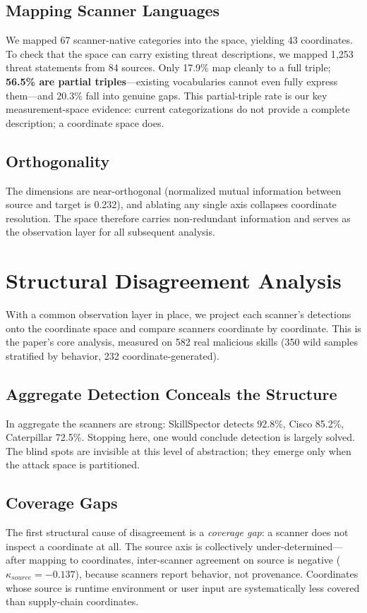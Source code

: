 \documentclass[sigconf,nonacm]{acmart}
\begin{document}
\subsection{Mapping Scanner Languages}
We mapped 67 scanner-native categories into the space, yielding 43 coordinates. To check that the space can carry existing threat descriptions, we mapped 1{,}253 threat statements from 84 sources. Only 17.9\% map cleanly to a full triple; \textbf{56.5\% are partial triples}---existing vocabularies cannot even fully express them---and 20.3\% fall into genuine gaps. This partial-triple rate is our key measurement-space evidence: current categorizations do not provide a complete description; a coordinate space does.

\subsection{Orthogonality}
The dimensions are near-orthogonal (normalized mutual information between source and target is 0.232), and ablating any single axis collapses coordinate resolution. The space therefore carries non-redundant information and serves as the observation layer for all subsequent analysis.

\section{Structural Disagreement Analysis}
\label{sec:explain}

With a common observation layer in place, we project each scanner's detections onto the coordinate space and compare scanners coordinate by coordinate. This is the paper's core analysis, measured on 582 real malicious skills (350 wild samples stratified by behavior, 232 coordinate-generated).

\subsection{Aggregate Detection Conceals the Structure}
In aggregate the scanners are strong: SkillSpector detects 92.8\%, Cisco 85.2\%, Caterpillar 72.5\%. Stopping here, one would conclude detection is largely solved. The blind spots are invisible at this level of abstraction; they emerge only when the attack space is partitioned.

\subsection{Coverage Gaps}
The first structural cause of disagreement is a \emph{coverage gap}: a scanner does not inspect a coordinate at all. The source axis is collectively under-determined---after mapping to coordinates, inter-scanner agreement on source is negative ($\kappa_{source}=-0.137$), because scanners report behavior, not provenance. Coordinates whose source is runtime environment or user input are systematically less covered than supply-chain coordinates.
\end{document}
